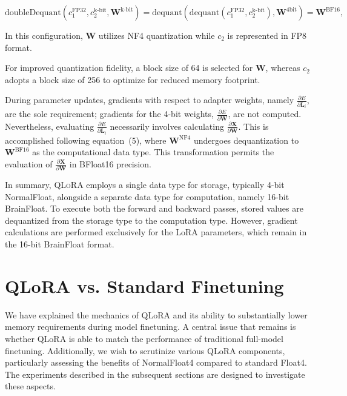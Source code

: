 \begin{equation}
    \text{doubleDequant}(c_1^{\text{FP32}}, c_2^{\text{k-bit}}, \mathbf{W}^{\text{k-bit}}) = \text{dequant}(\text{dequant}(c_1^{\text{FP32}}, c_2^{\text{k-bit}}), \mathbf{W}^{\text{4bit}}) = \mathbf{W}^{\text{BF16}},
\end{equation}

In this configuration, $\mathbf{W}$ utilizes NF4 quantization while $c_2$ is represented in FP8 format.

For improved quantization fidelity, a block size of 64 is selected for $\mathbf{W}$, whereas $c_2$ adopts a block size of 256 to optimize for reduced memory footprint.

During parameter updates, gradients with respect to adapter weights, namely $\frac{\partial E}{\partial \mathbf{L}_i}$, are the sole requirement; gradients for the 4-bit weights, $\frac{\partial E}{\partial \mathbf{W}}$, are not computed. Nevertheless, evaluating $\frac{\partial E}{\partial \mathbf{L}_i}$ necessarily involves calculating $\frac{\partial \mathbf{X}}{\partial \mathbf{W}}$. This is accomplished following equation~(5), where $\mathbf{W}^{\text{NF4}}$ undergoes dequantization to $\mathbf{W}^{\text{BF16}}$ as the computational data type. This transformation permits the evaluation of $\frac{\partial \mathbf{X}}{\partial \mathbf{W}}$ in BFloat16 precision.

In summary, \textsc{QLoRA} employs a single data type for storage, typically 4-bit NormalFloat, alongside a separate data type for computation, namely 16-bit BrainFloat. To execute both the forward and backward passes, stored values are dequantized from the storage type to the computation type. However, gradient calculations are performed exclusively for the LoRA parameters, which remain in the 16-bit BrainFloat format.

\section{QLoRA vs. Standard Finetuning}
\label{sec:comp_to_std}

We have explained the mechanics of QLoRA and its ability to substantially lower memory requirements during model finetuning. A central issue that remains is whether QLoRA is able to match the performance of traditional full-model finetuning. Additionally, we wish to scrutinize various QLoRA components, particularly assessing the benefits of NormalFloat4 compared to standard Float4. The experiments described in the subsequent sections are designed to investigate these aspects.

